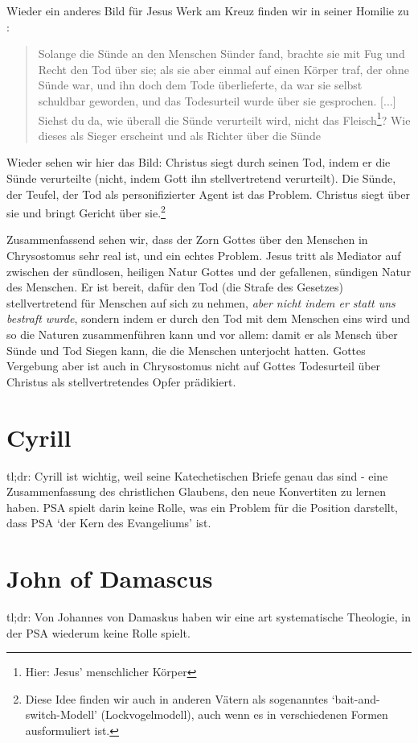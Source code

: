 Wieder ein anderes Bild für Jesus Werk am Kreuz finden wir in seiner Homilie zu :
\begin{quote}
	Solange die Sünde an den Menschen Sünder fand, brachte sie mit Fug und Recht den Tod über sie; als sie aber einmal auf einen Körper traf, der ohne Sünde war, und ihn doch dem Tode überlieferte, da war sie selbst schuldbar geworden, und das Todesurteil wurde über sie gesprochen.
	[...]
	Siehst du da, wie überall die Sünde verurteilt wird, nicht das Fleisch\footnote{Hier: Jesus' menschlicher Körper}? Wie dieses als Sieger erscheint und als Richter über die Sünde
\end{quote}
Wieder sehen wir hier das Bild: Christus siegt durch seinen Tod, indem er die Sünde verurteilte (nicht, indem Gott ihn stellvertretend verurteilt).
Die Sünde, der Teufel, der Tod als personifizierter Agent ist das Problem. Christus siegt über sie und bringt Gericht über sie.\footnote{
Diese Idee finden wir auch in anderen Vätern als sogenanntes `bait-and-switch-Modell' (Lockvogelmodell), auch wenn es in verschiedenen Formen ausformuliert ist.}

Zusammenfassend sehen wir, dass der Zorn Gottes über den Menschen in Chrysostomus sehr real ist, und ein echtes Problem.
Jesus tritt als Mediator auf zwischen der sündlosen, heiligen Natur Gottes und der gefallenen, sündigen Natur des Menschen.
Er ist bereit, dafür den Tod (die Strafe des Gesetzes) stellvertretend für Menschen auf sich zu nehmen, \textit{aber nicht indem er statt uns bestraft wurde},
sondern indem er durch den Tod mit dem Menschen eins wird und so die Naturen zusammenführen kann und vor allem:
damit er als Mensch über Sünde und Tod Siegen kann, die die Menschen unterjocht hatten.
Gottes Vergebung aber ist auch in Chrysostomus nicht auf Gottes Todesurteil über Christus als stellvertretendes Opfer prädikiert.

\section{Cyrill}
tl;dr:
Cyrill ist wichtig, weil seine Katechetischen Briefe genau das sind - eine Zusammenfassung des christlichen Glaubens, den neue Konvertiten zu lernen haben.
PSA spielt darin keine Rolle, was ein Problem für die Position darstellt, dass PSA `der Kern des Evangeliums' ist.


\section{John of Damascus}
tl;dr:
Von Johannes von Damaskus haben wir eine art systematische Theologie, in der PSA wiederum keine Rolle spielt.


